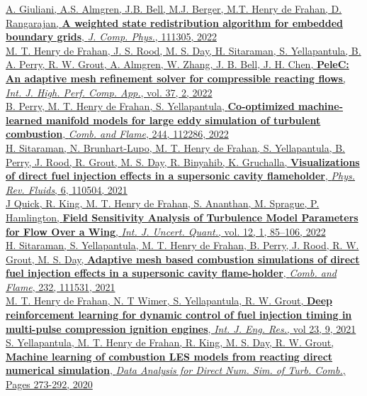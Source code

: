 \documentclass[11pt,letterpaper]{article}
\begin{document}
\href{https://doi.org/10.1103/PhysRevFluids.6.110504}{A. Giuliani, A.S. Almgren, J.B. Bell, M.J. Berger, M.T. Henry de Frahan, D. Rangarajan, \textbf{A weighted state redistribution algorithm for embedded boundary grids}, \textit{J. Comp. Phys.}, 111305, 2022}\\[2ex]
\href{https://doi.org/10.1177/10943420221121151}{M. T. Henry de Frahan, J. S. Rood, M. S. Day, H. Sitaraman, S. Yellapantula, B. A. Perry, R. W. Grout, A. Almgren, W. Zhang, J. B. Bell, J. H. Chen, \textbf{PeleC: An adaptive mesh refinement solver for compressible reacting flows}, \textit{Int. J. High. Perf. Comp. App.}, vol. 37, 2, 2022}\\[2ex]
\href{https://doi.org/10.1016/j.combustflame.2022.112286}{B. Perry, M. T. Henry de Frahan, S. Yellapantula, \textbf{Co-optimized machine-learned manifold models for large eddy simulation of turbulent combustion}, \textit{Comb. and Flame}, 244, 112286, 2022}\\[2ex]
\href{https://doi.org/10.1103/PhysRevFluids.6.110504}{H. Sitaraman, N. Brunhart-Lupo, M. T. Henry de Frahan, S. Yellapantula, B. Perry, J. Rood, R. Grout, M. S. Day, R. Binyahib, K. Gruchalla, \textbf{Visualizations of direct fuel injection effects in a supersonic cavity flameholder}, \textit{Phys. Rev. Fluids}, 6, 110504, 2021}\\[2ex]
\href{https://doi.org/10.1615/Int.J.UncertaintyQuantification.2021036467 }{J Quick, R. King, M. T. Henry de Frahan, S. Ananthan, M. Sprague, P. Hamlington, \textbf{Field Sensitivity Analysis of Turbulence Model Parameters for Flow Over a Wing}, \textit{Int. J. Uncert. Quant.}, vol. 12, 1, 85--106, 2022}\\[2ex]
\href{https://doi.org/10.1016/j.combustflame.2021.111531}{H. Sitaraman, S. Yellapantula, M. T. Henry de Frahan, B. Perry, J. Rood, R. W. Grout, M. S. Day, \textbf{Adaptive mesh based combustion simulations of direct fuel injection effects in a supersonic cavity flame-holder}, \textit{Comb. and Flame}, 232, 111531, 2021}\\[2ex]
\href{https://doi.org/10.1177/14680874211019345}{M. T. Henry de Frahan, N. T Wimer, S. Yellapantula, R. W. Grout, \textbf{Deep reinforcement learning for dynamic control of fuel injection timing in multi-pulse compression ignition engines}, \textit{Int. J. Eng. Res.}, vol 23, 9, 2021}\\[2ex]
\href{https://link.springer.com/chapter/10.1007/978-3-030-44718-2_14}{S. Yellapantula, M. T. Henry de Frahan, R. King, M. S. Day, R. W. Grout, \textbf{Machine learning of combustion LES models from reacting direct numerical simulation}, \textit{Data Analysis for Direct Num. Sim. of Turb. Comb.}, Pages 273-292, 2020}\\[2ex]
\end{document}
